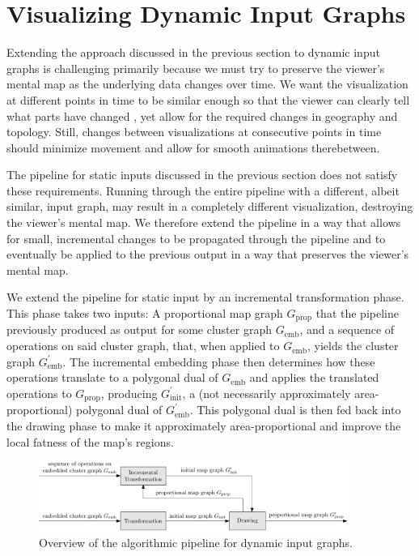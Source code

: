 \chapter{Visualizing Dynamic Input Graphs}
\label{chap:visualizing-dynamic-input-graphs}

Extending the approach discussed in the previous section to dynamic input graphs is challenging primarily because we must try to preserve the viewer's mental map as the underlying data changes over time. We want the visualization at different points in time to be similar enough so that the viewer can clearly tell what parts have changed \cite{mashima2011visualizing}, yet allow for the required changes in geography and topology. Still, changes between visualizations at consecutive points in time should minimize movement and allow for smooth animations therebetween.

The pipeline for static inputs discussed in the previous section does not satisfy these requirements. Running through the entire pipeline with a different, albeit similar, input graph, may result in a completely different visualization, destroying the viewer's mental map. We therefore extend the pipeline in a way that allows for small, incremental changes to be propagated through the pipeline and to eventually be applied to the previous output in a way that preserves the viewer's mental map.

We extend the pipeline for static input by an incremental transformation phase. This phase takes two inputs: A proportional map graph $G_\text{prop}$ that the pipeline previously produced as output for some cluster graph $G_\text{emb}$, and a sequence of operations on said cluster graph, that, when applied to $G_\text{emb}$, yields the cluster graph $G_\text{emb}^\prime$. The incremental embedding phase then determines how these operations translate to a polygonal dual of $G_\text{emb}$ and applies the translated operations to $G_\text{prop}$, producing $G_\text{init}^\prime$, a (not necessarily approximately area-proportional) polygonal dual of $G_\text{emb}^\prime$. This polygonal dual is then fed back into the drawing phase to make it approximately area-proportional and improve the local fatness of the map's regions.

\begin{figure}[H]
	\centering\includegraphics[width=0.9\textwidth]{Resources/Pipeline-Thesis-Dynamic.pdf}
	\caption{Overview of the algorithmic pipeline for dynamic input graphs.}
	\label{fig:dynamic-pipeline-thesis}
\end{figure}

